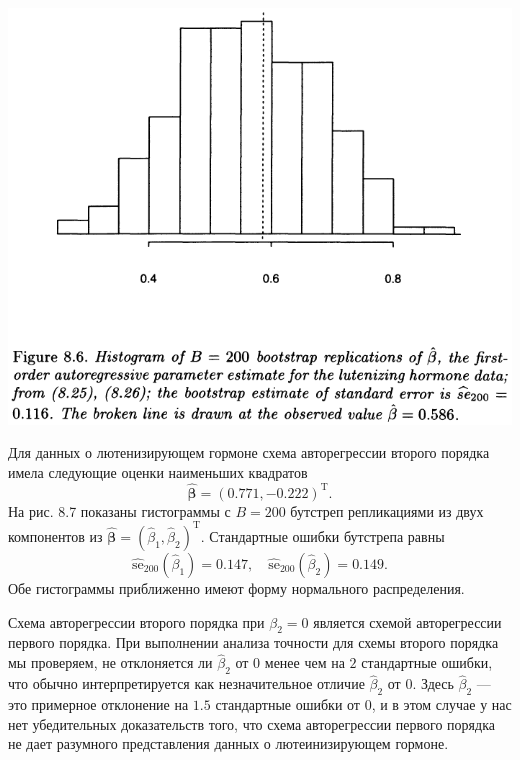 \noindent
\includegraphics[width=\linewidth]{8/f86}
\newline

Для данных о лютенизирующем гормоне схема авторегрессии второго порядка имела следующие оценки наименьших квадратов
\begin{equation}
	\hat{\bm \beta} = (0.771, -0.222)^\text{T}.
\end{equation}
На рис. 8.7 показаны гистограммы с $B=200$ бутстреп репликациями из двух компонентов из $\hat{\bm \beta} = (\hat{\beta}_1, \hat{\beta}_2)^\text{T}$. Стандартные ошибки бутстрепа равны
\begin{equation}
	\widehat{\text{se}}_{200} (\hat \beta_1) = 0.147, \quad \widehat{\text{se}}_{200} (\hat \beta_2) = 0.149.
\end{equation}
Обе гистограммы приближенно имеют форму нормального распределения.

Схема авторегрессии второго порядка при $\beta_2 = 0$ является схемой авторегрессии первого порядка. При выполнении анализа точности для схемы второго порядка мы проверяем, не отклоняется ли $\hat \beta_2$ от $0$ менее чем на $2$ стандартные ошибки, что обычно интерпретируется как незначительное отличие $\hat \beta_2$ от $0$. Здесь $\hat \beta_2$ --- это примерное отклонение на $1.5$ стандартные ошибки от $0$, и в этом случае у нас нет убедительных доказательств того, что схема авторегрессии первого порядка не дает разумного представления данных о лютеинизирующем гормоне.


